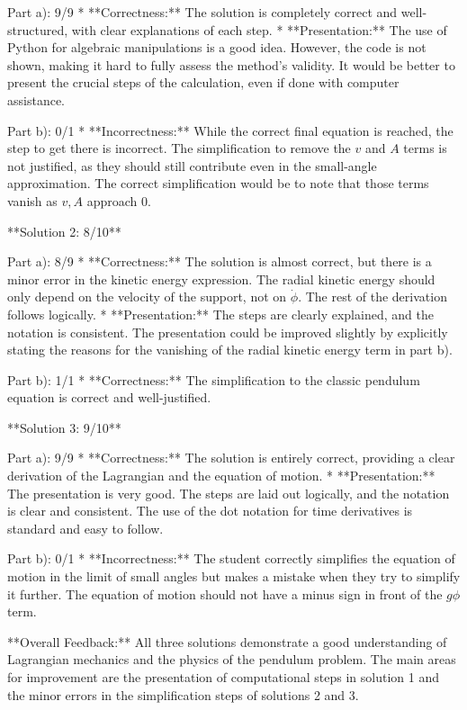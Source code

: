 \documentclass[a4paper,11pt]{article}
\begin{document}
Part a): 9/9 
* **Correctness:** The solution is completely correct and well-structured, with clear explanations of each step.
* **Presentation:** The use of Python for algebraic manipulations is a good idea. However, the code is not shown, making it hard to fully assess the method's validity. It would be better to present the crucial steps of the calculation, even if done with computer assistance.

Part b): 0/1
* **Incorrectness:** While the correct final equation is reached, the step to get there is incorrect. The simplification to remove the \( v \) and \( A \) terms is not justified, as they should still contribute even in the small-angle approximation. The correct simplification would be to note that those terms vanish as \( v, A \) approach 0.

**Solution 2: 8/10**

Part a): 8/9
* **Correctness:** The solution is almost correct, but there is a minor error in the kinetic energy expression. The radial kinetic energy should only depend on the velocity of the support, not on \( \dot{\phi} \). The rest of the derivation follows logically.
* **Presentation:** The steps are clearly explained, and the notation is consistent. The presentation could be improved slightly by explicitly stating the reasons for the vanishing of the radial kinetic energy term in part b).

Part b): 1/1
* **Correctness:** The simplification to the classic pendulum equation is correct and well-justified.

**Solution 3: 9/10**

Part a): 9/9
* **Correctness:** The solution is entirely correct, providing a clear derivation of the Lagrangian and the equation of motion.
* **Presentation:** The presentation is very good. The steps are laid out logically, and the notation is clear and consistent. The use of the dot notation for time derivatives is standard and easy to follow.

Part b): 0/1
* **Incorrectness:** The student correctly simplifies the equation of motion in the limit of small angles but makes a mistake when they try to simplify it further. The equation of motion should not have a minus sign in front of the \( g \phi \) term.

**Overall Feedback:** All three solutions demonstrate a good understanding of Lagrangian mechanics and the physics of the pendulum problem. The main areas for improvement are the presentation of computational steps in solution 1 and the minor errors in the simplification steps of solutions 2 and 3. 
\end{document}
